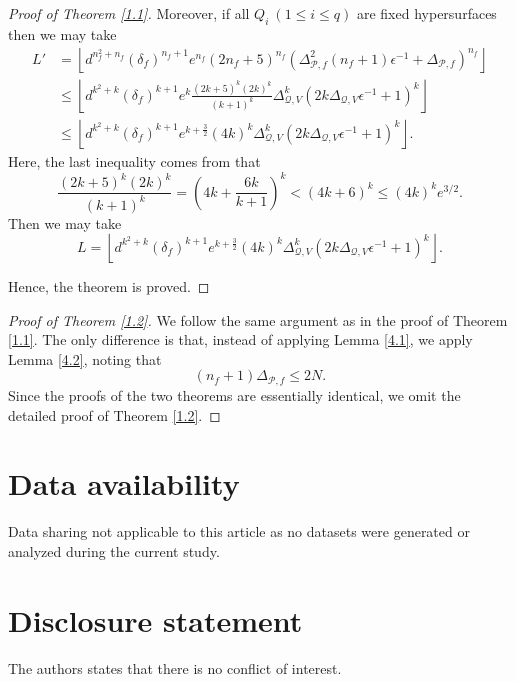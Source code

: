 \documentclass[12pt,leqno]{amsart}
\numberwithin{equation}{section}
\begin{document}
\begin{proof}[Proof of Theorem \ref{1.1}]
Moreover, if all $Q_i\ (1\le i\le q)$ are fixed hypersurfaces then we may take 
\begin{align*}L'&=\left\lfloor d^{n_f^2+n_f}(\delta_f)^{n_f+1}e^{n_f}(2n_f+5)^{n_f}(\Delta^2_{\mathcal P,f}(n_f+1)\epsilon^{-1}+\Delta_{\mathcal P,f})^{n_f}\right\rfloor\\
&\le \left\lfloor d^{k^2+k}(\delta_f)^{k+1}e^{k}\frac{(2k+5)^{k}(2k)^k}{(k+1)^k}\Delta_{\mathcal Q,V}^k(2k\Delta_{\mathcal Q,V}\epsilon^{-1}+1)^k\right\rfloor\\
&\le \left\lfloor d^{k^2+k}(\delta_f)^{k+1}e^{k+\frac{3}{2}}(4k)^k\Delta_{\mathcal Q,V}^k(2k\Delta_{\mathcal Q,V}\epsilon^{-1}+1)^k\right\rfloor.
\end{align*}
Here, the last inequality comes from that 
$$\frac{(2k+5)^{k}(2k)^k}{(k+1)^k}=\left(4k+\frac{6k}{k+1}\right)^k<(4k+6)^k\le (4k)^ke^{3/2}.$$ 
Then we may take
$$ L=\left\lfloor d^{k^2+k}(\delta_f)^{k+1}e^{k+\frac{3}{2}}(4k)^k\Delta_{\mathcal Q,V}^k(2k\Delta_{\mathcal Q,V}\epsilon^{-1}+1)^k\right\rfloor.$$

Hence, the theorem is proved.
\end{proof}

\begin{proof}[Proof of Theorem \ref{1.2}]
We follow the same argument as in the proof of Theorem \ref{1.1}. The only difference is that, instead of applying Lemma \ref{4.1}, we apply Lemma \ref{4.2}, noting that
$$(n_f+1)\Delta_{\mathcal P,f}\le 2N.$$
Since the proofs of the two theorems are essentially identical, we omit the detailed proof of Theorem \ref{1.2}.
\end{proof}
\vskip0.2cm
\noindent
\section*{Data availability}
Data sharing not applicable to this article as no datasets were generated or analyzed during the current study.

\section*{Disclosure statement} 
The authors states that there is no conflict of interest. 
\end{document}
